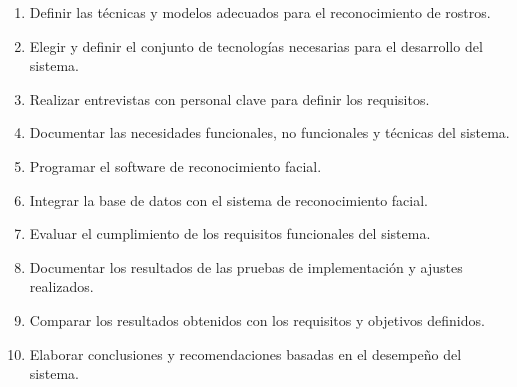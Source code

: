 \begin{enumerate}
    \item Definir las técnicas y modelos adecuados para el reconocimiento de rostros.
    \item Elegir y definir el conjunto de tecnologías necesarias para el desarrollo del sistema.
    \item Realizar entrevistas con personal clave para definir los requisitos.
    \item Documentar las necesidades funcionales, no funcionales y técnicas del sistema.
    \item Programar el software de reconocimiento facial.
    \item Integrar la base de datos con el sistema de reconocimiento facial.
    \item Evaluar el cumplimiento de los requisitos funcionales del sistema.
    \item Documentar los resultados de las pruebas de implementación y ajustes realizados.
    \item Comparar los resultados obtenidos con los requisitos y objetivos definidos.
    \item Elaborar conclusiones y recomendaciones basadas en el desempeño del sistema.
\end{enumerate}


